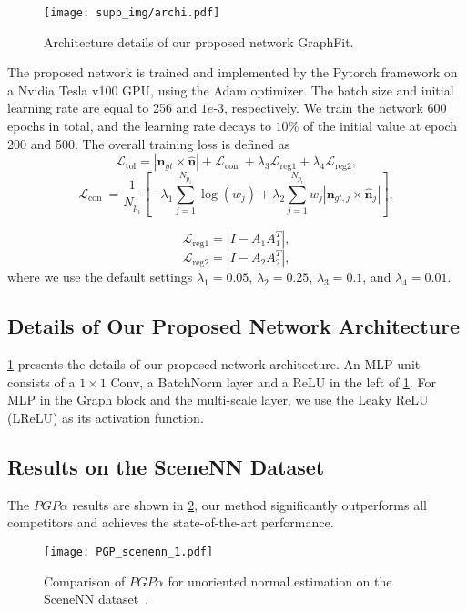 \documentclass[runningheads]{llncs}
\begin{document}
\begin{figure}[]
  \centering
 \texttt{[image: supp\_img/archi.pdf]}
  \caption{Architecture details of our proposed network GraphFit.}
  \label{fig:GraphFit}
\end{figure}
The proposed network is trained and implemented by the Pytorch framework on a Nvidia Tesla v100 GPU, using the Adam optimizer\cite{kingma2014adam}. The batch size and initial learning rate are equal to 256 and $1e\mbox{-}3$, respectively. We train the network 600 epochs in total, and the learning rate decays to $10\%$ of the initial value at epoch 200 and 500. The overall training loss is defined as
\\
\begin{equation}
\mathcal{L}_{\text{tol}}=\left|\mathbf{n}_{gt} \times  \hat{\mathbf{n}}\right|+\mathcal{L}_{\text {con }}+\lambda_{3} \mathcal{L}_{\text {reg1}}+\lambda_{4} \mathcal{L}_{\text {reg2}},
\end{equation}
\begin{equation}
\mathcal{L}_{\text {con }}=\frac{1}{N_{p_{i}}}\left[-\lambda_{1} \sum_{j=1}^{N_{p_{i}}} \log \left(w_{j}\right)+\lambda_{2} \sum_{j=1}^{N_{p_{i}}} w_{j}\left|\mathbf{n}_{gt, j} \times \hat{\mathbf{n}}_{j}\right|\right],
\end{equation}

\begin{equation}
\mathcal{L}_{\text{reg1}}=\left|I-A_{1} A_{1}^{T}\right|,
\end{equation}
\begin{equation}
\mathcal{L}_{\text{reg2}}=\left|I-A_{2} A_{2}^{T}\right|,
\end{equation}
where we use the default settings $\lambda_{1} = 0.05$, $\lambda_{2} = 0.25$, $\lambda_{3}=0.1$, and $\lambda_{4} = 0.01$.
\subsection{Details of Our Proposed Network Architecture}
\cref{fig:GraphFit} presents the details of our proposed network architecture. An MLP unit consists of a $1\times1 $ Conv, a BatchNorm layer and a ReLU in the left of \cref{fig:GraphFit}. For MLP in the Graph block and the multi-scale layer, we use the Leaky ReLU (LReLU) as its activation function.
\subsection{Results on the SceneNN Dataset}
 The $PGP \alpha$ results are shown in \cref{fig:scenenn},  our method significantly outperforms all competitors and achieves the state-of-the-art performance.
\begin{figure}[h]
  \centering
     \texttt{[image: PGP\_scenenn\_1.pdf]}
   \caption{Comparison of $PGP \alpha $ for unoriented normal estimation on the SceneNN dataset~\cite{hua-pointwise-cvpr18}.
   }
   \label{fig:scenenn}
\end{figure}
\end{document}
